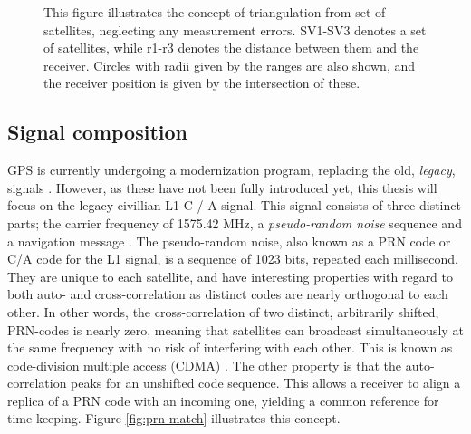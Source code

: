 \begin{figure}
    \centering
    
    \caption{This figure illustrates the concept of triangulation from set of satellites, neglecting any measurement errors. SV1-SV3 denotes a set of satellites, while r1-r3 denotes the distance between them and the receiver. Circles with radii given by the ranges are also shown, and the receiver position is given by the intersection of these.}
    \label{fig:pos-est}
\end{figure}

\subsection{Signal composition}
GPS is currently undergoing a modernization program, replacing the old, \textit{legacy}, signals \cite{groves2013principles, farrell2008aided}. However, as these have not been fully introduced yet, this thesis will focus on the legacy civillian L1 C / A signal. This signal consists of three distinct parts; the carrier frequency of 1575.42 MHz, a \textit{pseudo-random noise} sequence and a navigation message \cite{misra2006global}. The pseudo-random noise, also known as a PRN code or C/A code for the L1 signal, is a sequence of 1023 bits, repeated each millisecond. They are unique to each satellite, and have interesting properties with regard to both auto- and cross-correlation as distinct codes are nearly orthogonal to each other. In other words, the cross-correlation of two distinct, arbitrarily shifted, PRN-codes is nearly zero, meaning that satellites can broadcast simultaneously at the same frequency with no risk of interfering with each other. This is known as code-division multiple access (CDMA) \cite{groves2013principles}. The other property is that the auto-correlation peaks for an unshifted code sequence. This allows a receiver to align a replica of a PRN code with an incoming one, yielding a common reference for time keeping. Figure \ref{fig:prn-match} illustrates this concept.\\

